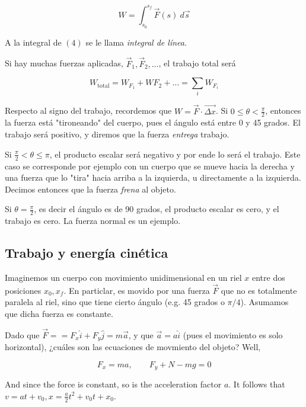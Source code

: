\documentclass[12pt]{article}
\theoremstyle{definition}
\begin{document}
\begin{equation}
    W = \int_{s_0}^{s_f} \vec{F}(s) ~ d\vec{s}
\end{equation}

A la integral de $(4)$ se le llama \textit{integral de línea}.

Si hay muchas fuerzas aplicadas, $\vec{F}_1, \vec{F}_2, \ldots$, el trabajo
total será 

\begin{equation*}
    W_{\text{total}}= W_{F_1} + W F_2 + \ldots = \sum_{i} W_{F_i}
\end{equation*}

Respecto al signo del trabajo, recordemos que $W = \vec{F} \cdot \vec{\Delta
x}$. Si $ 0 \leq \theta < \frac{\pi}{2}$, entonces la fuerza está "tironeando"
del cuerpo, pues el ángulo está entre 0 y 45 grados. El trabajo será positivo, y
diremos que la fuerza \textit{entrega} trabajo.

Si $\frac{\pi}{2} < \theta \leq \pi$, el producto escalar será negativo y por
ende lo será el trabajo. Este caso se corresponde por ejemplo con un cuerpo que
se mueve hacia la derecha y una fuerza que lo "tira" hacia arriba a la
izquierda, u directamente a la izquierda. Decimos entonces que la fuerza \textit{frena} al objeto.

Si $\theta = \frac{\pi}{2}$, es decir el ángulo es de 90 grados, el producto
escalar es cero, y el trabajo es cero. La fuerza normal es un ejemplo.

\subsection{Trabajo y energía cinética}

Imaginemos un cuerpo con movimiento unidimensional en un riel $x$ entre dos
posiciones $x_0, x_f$. En particlar, es movido por una fuerza $\vec{F}$ que no
es totalmente paralela al riel, sino que tiene cierto ángulo (e.g. 45 grados o
$\pi / 4$). Asumamos que dicha fuerza es constante.

Dado que $\vec{F} = = F_x \hat{i} + F_y \hat{j} = m \vec{a}$, y que $\vec{a} = a
\hat{i}$ (pues el movimiento es solo horizontal), ¿cuáles son las ecuaciones de
movmiento del objeto? Well, 

\begin{equation*}
    F_x = m a, \qquad F_y + N - mg = 0
\end{equation*}

And since the force is constant, so is the acceleration factor $a$. It follows
that $v = at + v_0, x = \frac{a}{2}t^2 + v_0 t + x_0$. 
\end{document}
